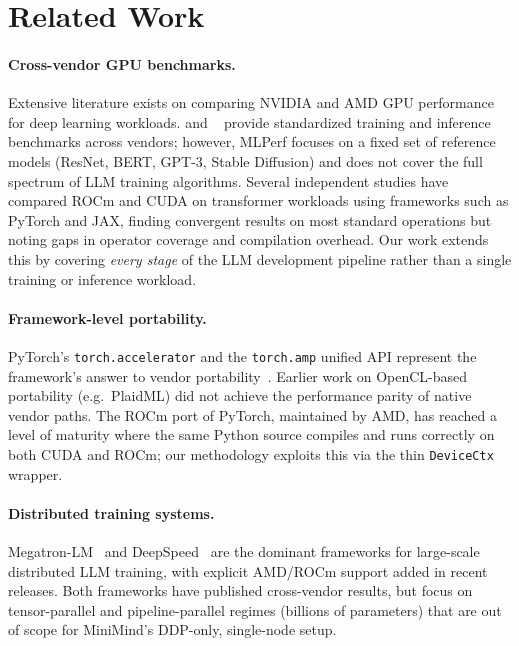 \section{Related Work}
\label{sec:related}

\paragraph{Cross-vendor GPU benchmarks.}
Extensive literature exists on comparing NVIDIA and AMD GPU performance for
deep learning workloads.  \citet{mlperf_training} and \citet{mlperf_inference}~\citep{mlperf2023}
provide standardized training and inference benchmarks across vendors; however,
MLPerf focuses on a fixed set of reference models (ResNet, BERT, GPT-3,
Stable Diffusion) and does not cover the full spectrum of LLM training
algorithms.  Several independent studies have compared
ROCm and CUDA on transformer workloads using frameworks such as PyTorch and
JAX, finding convergent results on most standard operations but noting gaps
in operator coverage and compilation overhead.  Our work extends this by
covering \emph{every stage} of the LLM development pipeline rather than a
single training or inference workload.

\paragraph{Framework-level portability.}
PyTorch's \texttt{torch.accelerator} and the \texttt{torch.amp} unified API
represent the framework's answer to vendor portability~\citep{paszke2019pytorch}.
Earlier work on OpenCL-based portability (e.g.\ PlaidML) did not achieve
the performance parity of native vendor paths.  The ROCm port of PyTorch,
maintained by AMD, has reached a level of maturity where the same Python
source compiles and runs correctly on both CUDA and ROCm; our methodology
exploits this via the thin \texttt{DeviceCtx} wrapper.

\paragraph{Distributed training systems.}
Megatron-LM~\citep{narayanan2021efficient} and DeepSpeed~\citep{rajbhandari2020zero} are the
dominant frameworks for large-scale distributed LLM training, with explicit
AMD/ROCm support added in recent releases.  Both frameworks have published
cross-vendor results, but focus on tensor-parallel and pipeline-parallel
regimes (billions of parameters) that are out of scope for MiniMind's
DDP-only, single-node setup.

